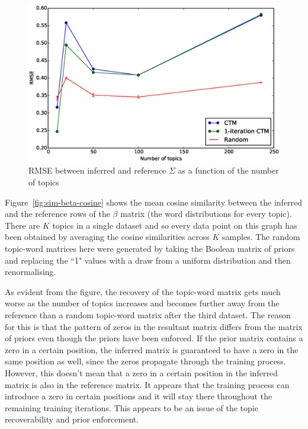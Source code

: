 \documentclass[12pt,a4paper,twoside,openright]{report}
\begin{document}
\begin{figure}[!htb]
\includegraphics[width=\textwidth]{sim-sigma-rmse.eps}
\caption{RMSE between inferred and reference $\Sigma$ as a function of the number of topics}
\label{fig:sim-sigma-rmse}
\end{figure}

Figure~\ref{fig:sim-beta-cosine} shows the mean cosine similarity between the inferred and the reference rows of the $\beta$ matrix (the word distributions for every topic). There are $K$ topics in a single dataset and so every data point on this graph has been obtained by averaging the cosine similarities across $K$ samples. The random topic-word matrices here were generated by taking the Boolean matrix of priors and replacing the ``1" values with a draw from a uniform distribution and then renormalising.

As evident from the figure, the recovery of the topic-word matrix gets much worse as the number of topics increases and becomes further away from the reference than a random topic-word matrix after the third dataset. The reason for this is that the pattern of zeros in the resultant matrix differs from the matrix of priors even though the priors have been enforced. If the prior matrix contains a zero in a certain position, the inferred matrix is guaranteed to have a zero in the same position as well, since the zeros propagate through the training process. However, this doesn't mean that a zero in a certain position in the inferred matrix is also in the reference matrix. It appears that the training process can introduce a zero in certain positions and it will stay there throughout the remaining training iterations. This appears to be an issue of the topic recoverability and prior enforcement.
\end{document}
